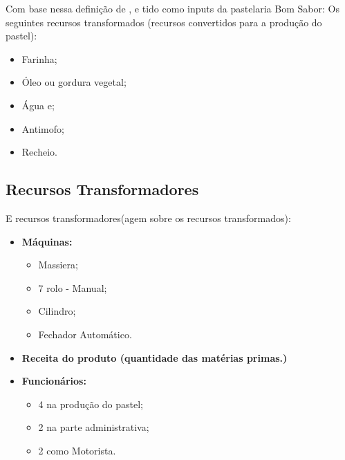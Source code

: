 Com base nessa definição de \cite{slack}, e tido como inputs da pastelaria Bom Sabor:
Os seguintes recursos transformados (recursos convertidos para a produção do pastel):

\begin{itemize}
\item Farinha;
\item Óleo ou gordura vegetal;
\item Água e;
\item Antimofo;
\item Recheio.
\end{itemize}

\subsection{Recursos Transformadores}

E recursos transformadores(agem sobre os recursos transformados):

\begin{itemize}
\item \textbf{Máquinas:}
	\begin{itemize}
	\item Massiera;
	\item 7 rolo - Manual;
	\item Cilindro;
	\item Fechador Automático.
	\end{itemize}
\item \textbf{Receita do produto (quantidade das matérias primas.)}
\item \textbf{Funcionários:} 
	\begin{itemize}
	\item 4 na produção do pastel;
	\item 2 na parte administrativa;
	\item 2 como Motorista.
	\end{itemize}
\end{itemize}